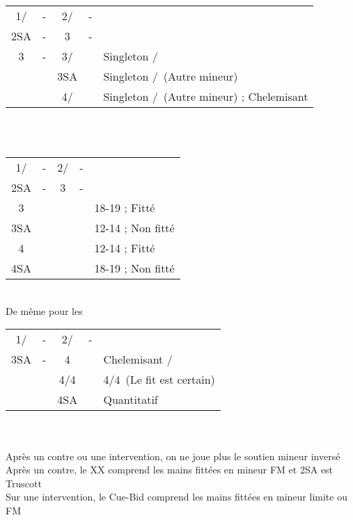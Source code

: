 \documentclass[a4paper, oneside, 11pt]{report}
\begin{document}
		\begin{tabular}{cccc|l}
		1\trefle/\carreau & - & 2\trefle/\carreau & - &\\
		2SA & - & 3\trefle & - &\\
		3\carreau & - & 3\coeur/\pique && Singleton \pique/\coeur\\	
		&& 3SA && Singleton \carreau/\trefle\ (Autre mineur)\\
		&& 4\trefle/\carreau && Singleton \carreau/\trefle\ (Autre mineur) ; Chelemisant\\
		\end{tabular}\\\\

		\begin{tabular}{cccc|l}
		1\trefle/\carreau & - & 2\trefle/\carreau & - &\\
		2SA & - & 3\carreau & - &\\
		3\coeur &&&& 18-19 ; Fitté\\
		3SA &&&& 12-14 ; Non fitté\\
		4\coeur &&&& 12-14 ; Fitté\\
		4SA &&&& 18-19 ; Non fitté\\
		\end{tabular}\\
		De même pour les \pique\\

		\begin{tabular}{cccc|l}
		1\trefle/\carreau & - & 2\trefle/\carreau & - &\\
		3SA & - & 4\trefle && Chelemisant \trefle/\carreau\\
		&& 4\carreau/4\coeur && 4\coeur/4\pique\ (Le fit est certain)\\
		&& 4SA && Quantitatif\\
		\end{tabular}\\\\

		Après un contre ou une intervention, on ne joue plus le soutien mineur inversé\\
		Après un contre, le XX comprend les mains fittées en mineur FM et 2SA est Truscott\\
		Sur une intervention, le Cue-Bid comprend les mains fittées en mineur limite ou FM\\
\end{document}
